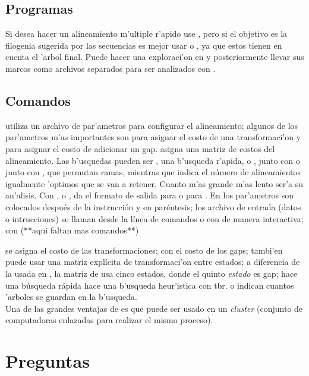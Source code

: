 \subsection{Programas}
Si desea hacer un alineamiento m'ultiple r'apido use , pero si el objetivo es la filogenia sugerida por las 
secuencias es mejor usar  o , ya que estos tienen en cuenta el 'arbol final. Puede hacer una 
exploraci'on en  y posteriormente llevar sus marcos como archivos separados para ser analizados con .
\subsection{Comandos}
 utiliza un archivo de par'ametros para configurar el alineamiento; algunos de los par'ametros m'as 
importantes son  para asignar el costo de una transformaci'on y  para asignar el costo de 
adicionar un gap.  asigna una matriz de costos del alineamiento. Las b'usquedas pueden ser , 
una b'usqueda r'apida, o , junto con  o junto con , que permutan ramas, 
mientras que  indica el n\'umero de alineamientos igualmente 'optimos que se van a retener. Cuanto m'as grande 
m'as lento ser'a su an'alisis. Con , o , da el formato de salida para  o 
para . En  los par'ametros son colocados despu\'es de la instrucci\'on y en par\'entesis; los archivo de entrada (datos o intrucciones) se llaman desde la l\'inea de comandos  o con  de manera interactiva; con
(**aqui faltan mas comandos**)
 
 se asigna el costo de las transformaciones; con  el costo de los gaps; tambi'en puede usar 
una matriz expl\'icita de transformaci'on entre estados; a diferencia de la usada en , la matriz de 
 usa cinco estados, donde el quinto \textit{estado} es gap; 
 hace una b\'usqueda r\'apida 
\Cmd{} hace una b'usqueda heur'istica 
con tbr. \Cmd{} o \Cmd{} indican cuantos 'arboles se guardan en la b'usqueda.\\ 


Una de las grandes ventajas 
de  es que puede ser usado en un \textit{cluster} (conjunto de computadoras enlazadas para realizar el mismo proceso).
\section{Preguntas}
